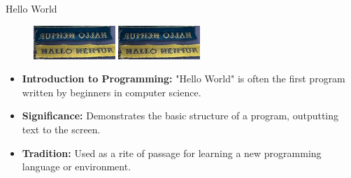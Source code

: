 \documentclass[
    NAME={Dr. Helga Ingimundardóttir},
    EMAIL={helgaingim@hi.is},
    FACULTY={Industrial Engineering},
    TITLE={HiDef Textiles: Reviving Tradition with Innovation},
    SUBTITLE={Empowering Creativity and Sustainability in Textile Production through Digital Transformation},
    SEMINAR={Reykjavík DataBeers},
    DATE={January 25, 2025},
    WIDE={true}
]{HI-LaTeX/hi-beamer}
\begin{document}
    \begin{frame}{Hello World}
        \begin{figure}
            \centering
            \includegraphics[height=36pt, clip=true, trim=0 5mm 0 0]{include/helloworld.png}
            \includegraphics[height=36pt, clip=true, trim=0 0 0 5mm]{include/helloworld.png}
        \end{figure}


        \begin{itemize}
            \item \textbf{Introduction to Programming:} "Hello World" is often the first program written by beginners in computer science.
            \item \textbf{Significance:} Demonstrates the basic structure of a program, outputting text to the screen.
            \item \textbf{Tradition:} Used as a rite of passage for learning a new programming language or environment.
        \end{itemize}
    \end{frame}
\end{document}
